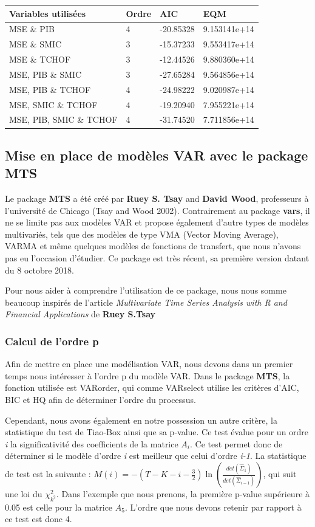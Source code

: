 \documentclass[11pt,]{article}
\begin{document}
\begin{longtable}[]{@{}llll@{}}
\toprule
Variables utilisées & Ordre & AIC & EQM\tabularnewline
\midrule
\endhead
MSE \& PIB & 4 & -20.85328 & 9.153141e+14\tabularnewline
MSE \& SMIC & 3 & -15.37233 & 9.553417e+14\tabularnewline
MSE \& TCHOF & 3 & -12.44526 & 9.880360e+14\tabularnewline
MSE, PIB \& SMIC & 3 & -27.65284 & 9.564856e+14\tabularnewline
MSE, PIB \& TCHOF & 4 & -24.98222 & 9.020987e+14\tabularnewline
MSE, SMIC \& TCHOF & 4 & -19.20940 & 7.955221e+14\tabularnewline
MSE, PIB, SMIC \& TCHOF & 4 & -31.74520 & 7.711856e+14\tabularnewline
\bottomrule
\end{longtable}

\newpage

\subsection{Mise en place de modèles VAR avec le package
MTS}\label{mise-en-place-de-modeles-var-avec-le-package-mts}

Le package \textbf{MTS} a été créé par \textbf{Ruey S. Tsay} and
\textbf{David Wood}, professeurs à l'université de Chicago (Tsay and
Wood 2002). Contrairement au package \textbf{vars}, il ne se limite pas
aux modèles VAR et propose également d'autre types de modèles
multivariés, tels que des modèles de type VMA (Vector Moving Average),
VARMA et même quelques modèles de fonctions de transfert, que nous
n'avons pas eu l'occasion d'étudier. Ce package est très récent, sa
première version datant du 8 octobre 2018.

Pour nous aider à comprendre l'utilisation de ce package, nous nous
somme beaucoup inspirés de l'article \emph{Multivariate Time Series
Analysis with R and Financial Applications} de \textbf{Ruey S.Tsay}

\subsubsection{Calcul de l'ordre p}\label{calcul-de-lordre-p-1}

Afin de mettre en place une modélisation VAR, nous devons dans un
premier temps nous intéresser à l'ordre p du modèle VAR. Dans le package
\textbf{MTS}, la fonction utilisée est VARorder, qui comme VARselect
utilise les critères d'AIC, BIC et HQ afin de déterminer l'ordre du
processus.

Cependant, nous avons également en notre possession un autre critère, la
statistique du test de Tiao-Box ainsi que sa p-value. Ce test évalue
pour un ordre \emph{i} la significativité des coefficients de la matrice
\(A_i\). Ce test permet donc de déterminer si le modèle d'ordre \emph{i}
est meilleur que celui d'ordre \emph{i-1}. La statistique de test est la
suivante :
\(M(i) = -(T-K-i-\frac{3}{2}) \ln(\frac{det(\hat{\Sigma}_1)}{det(\hat{\Sigma}_{i-1})})\),
qui suit une loi du \(\chi^2_{k^2}\). Dans l'exemple que nous prenons,
la première p-value supérieure à 0.05 est celle pour la matrice \(A_5\).
L'ordre que nous devons retenir par rapport à ce test est donc 4.
\end{document}
